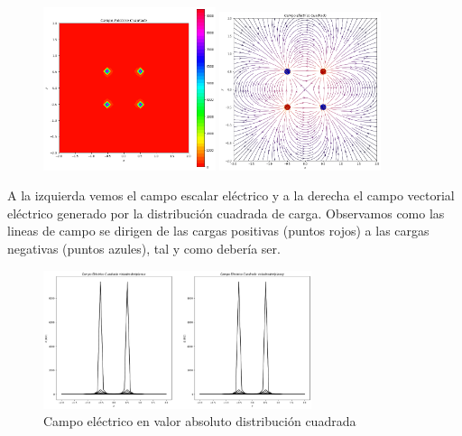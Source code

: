 \documentclass[11pt]{article}
\begin{document}
    \vspace{0.2cm}\begin{figure}[h]
        \centering
        \includegraphics[width=0.45\textwidth]{cuadrado2.png}
        \includegraphics[width=0.42\textwidth]{cuadrado3.png}
    \end{figure}
    
    \vspace{0.4cm} A la izquierda vemos el campo escalar eléctrico y a la derecha el campo vectorial eléctrico generado por la distribución cuadrada de carga. Observamos como las lineas de campo se dirigen de las cargas positivas (puntos rojos) a las cargas negativas (puntos azules), tal y como debería ser. 

    \vspace{0.2cm}
        \begin{figure}[h]
            \centering
            \includegraphics[width=0.7\textwidth]{cuadrado1.png}
            \caption{Campo eléctrico en valor absoluto distribución cuadrada}
        \end{figure}
        
\end{document}
